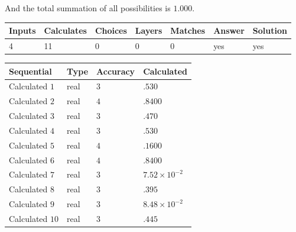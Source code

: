 \documentclass[12pt]{article}
\begin{document}
\noindent
 And the total summation of all possibilities is $  %
1.000 $.
 
 
 
\noindent{}
 
 

 
\vspace{0.3in}
   
   
   
   
\noindent\begin{tabular}{|l|l|l|l|l|l|l|}
 \hline
Inputs & Calculates & Choices & Layers & Matches & Answer & Solution \\ \hline
           4 & 
          11 & 
           0
  & 
           0 & 
           0 & 
  yes & 
  yes 
  \\ \hline
 \end{tabular}
   
   
   
   
\noindent{}
   
   
  
  
\noindent\begin{tabular}{|l|l|l|l|}
\hline
 Sequential & Type & Accuracy & Calculated \\ 
\hline
 
 
  Calculated $           1$ & real & $           3 $ & 
 $ .530 $ 
 \\  \hline  
 
 
  Calculated $           2$ & real & $           4 $ & 
 $ .8400 $ 
 \\  \hline  
 
 
  Calculated $           3$ & real & $           3 $ & 
 $ .470 $ 
 \\  \hline  
 
 
  Calculated $           4$ & real & $           3 $ & 
 $ .530 $ 
 \\  \hline  
 
 
  Calculated $           5$ & real & $           4 $ & 
 $ .1600 $ 
 \\  \hline  
 
 
  Calculated $           6$ & real & $           4 $ & 
 $ .8400 $ 
 \\  \hline  
 
 
  Calculated $           7$ & real & $           3 $ & 
 $ 7.52 \times 10^{-2} $ 
 \\  \hline  
 
 
  Calculated $           8$ & real & $           3 $ & 
 $ .395 $ 
 \\  \hline  
 
 
  Calculated $           9$ & real & $           3 $ & 
 $ 8.48 \times 10^{-2} $ 
 \\  \hline  
 
 
  Calculated $          10$ & real & $           3 $ & 
 $ .445 $ 
 \\  \hline  
 \end{tabular}
   
\end{document}
